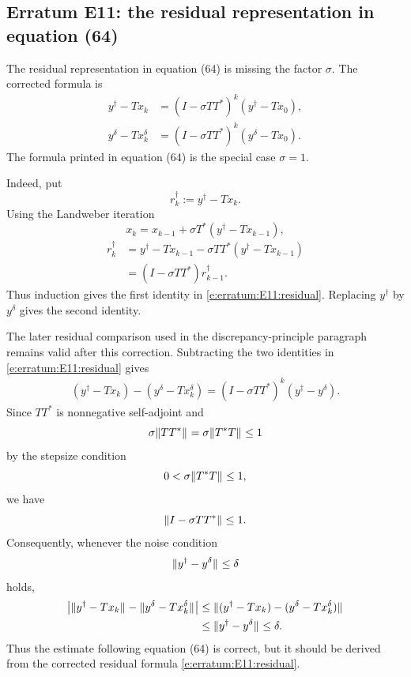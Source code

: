 
\subsection*{Erratum E11: the residual representation in equation (64)}
\label{s:erratum:E11}

The residual representation in equation (64) is missing the factor $\sigma$.
The corrected formula is
\begin{align}
\label{e:erratum:E11:residual}
        y^\dag - T x_k
        &=
        (I-\sigma T T^*)^k (y^\dag - T x_0),
        \\
        y^\delta - T x_k^\delta
        &=
        (I-\sigma T T^*)^k (y^\delta - T x_0).
\end{align}
The formula printed in equation (64) is the special case $\sigma=1$.

Indeed, put
\[
        r_k^\dag := y^\dag - T x_k .
\]
Using the Landweber iteration
\[
        x_k=x_{k-1}+\sigma T^*(y^\dag-Tx_{k-1}),
\]
\begin{align*}
        r_k^\dag
        &=
        y^\dag - T x_{k-1}
        - \sigma T T^*(y^\dag - T x_{k-1})
        \\
        &=
        (I-\sigma T T^*) r_{k-1}^\dag .
\end{align*}
Thus induction gives the first identity in
\eqref{e:erratum:E11:residual}.  Replacing $y^\dag$ by $y^\delta$ gives
the second identity.

The later residual comparison used in the discrepancy-principle paragraph
remains valid after this correction.  Subtracting the two identities in
\eqref{e:erratum:E11:residual} gives
\begin{align*}
        (y^\dag - T x_k) - (y^\delta - T x_k^\delta)
        =
        (I-\sigma T T^*)^k (y^\dag-y^\delta).
\end{align*}
Since $T T^*$ is nonnegative self-adjoint and
\[
        \sigma \| T T^* \|_{  }
        =
        \sigma \| T^*T \|_{  }
        \leq 1
\]
by the stepsize condition
\[
        0<\sigma \| T^*T \|_{  }\le 1,
\]
we have
\[
        \| I-\sigma T T^* \|_{  } \leq 1 .
\]
Consequently, whenever the noise condition
\[
        \|  y^\dag - y^\delta  \|_{  } \le \delta
\]
holds,
\begin{align*}
        \left|
                \| y^\dag - T x_k \|_{  }
                -
                \| y^\delta - T x_k^\delta \|_{  }
        \right|
        &\leq
        \| (y^\dag - T x_k) - (y^\delta - T x_k^\delta) \|_{  }
        \\
        &\leq
        \| y^\dag-y^\delta \|_{  }
        \leq
        \delta .
\end{align*}
Thus the estimate following equation (64) is correct, but it should be
derived from the corrected residual formula \eqref{e:erratum:E11:residual}.
